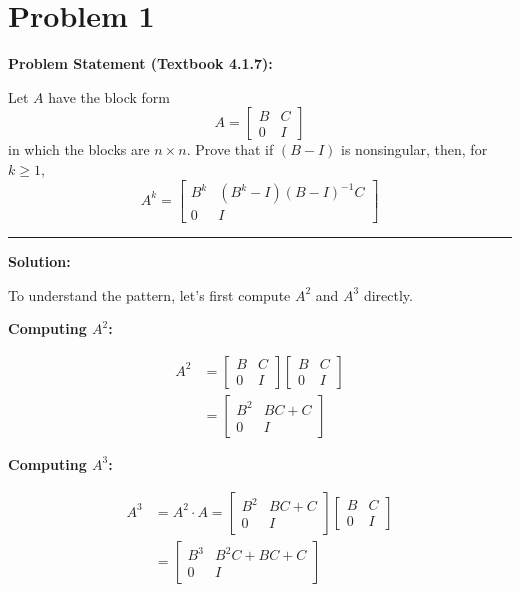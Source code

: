 \clearpage
\section*{Problem 1}

\textbf{Problem Statement (Textbook 4.1.7):} 

Let $A$ have the block form
$$A = \begin{bmatrix} B & C \\ 0 & I \end{bmatrix}$$
in which the blocks are $n \times n$. Prove that if $(B - I)$ is nonsingular, then, for $k \geq 1$,
$$A^k = \begin{bmatrix} B^k & (B^k - I)(B - I)^{-1}C \\ 0 & I \end{bmatrix}$$

\noindent\rule{\textwidth}{0.4pt}

\vspace{1em}

\textbf{Solution:}

To understand the pattern, let's first compute $A^2$ and $A^3$ directly.

\textbf{Computing $A^2$:}

\begin{align*}
A^2 &= \begin{bmatrix} B & C \\ 0 & I \end{bmatrix} \begin{bmatrix} B & C \\ 0 & I \end{bmatrix} \\[6pt]
&= \begin{bmatrix} B^2 & BC + C \\ 0 & I \end{bmatrix}
\end{align*}

\textbf{Computing $A^3$:}

\begin{align*}
A^3 &= A^2 \cdot A = \begin{bmatrix} B^2 & BC + C \\ 0 & I \end{bmatrix} \begin{bmatrix} B & C \\ 0 & I \end{bmatrix} \\[6pt]
&= \begin{bmatrix} B^3 & B^2C + BC + C \\ 0 & I \end{bmatrix}
\end{align*}

